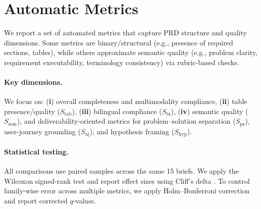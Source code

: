 \section{Automatic Metrics}
\label{sec:metrics}

We report a set of automated metrics that capture PRD structure and quality dimensions.
Some metrics are binary/structural (e.g., presence of required sections, tables), while others approximate semantic quality (e.g., problem clarity, requirement executability, terminology consistency) via rubric-based checks.

\paragraph{Key dimensions.}
We focus on:
(\textbf{i}) overall completeness and multimodality compliance,
(\textbf{ii}) table presence/quality (\(S_{\mathrm{tab}}\)),
(\textbf{iii}) bilingual compliance (\(S_{\mathrm{bi}}\)),
(\textbf{iv}) semantic quality (\(S_{\mathrm{sem}}\)),
and deliverability-oriented metrics for problem--solution separation (\(S_{\mathrm{ps}}\)), user-journey grounding (\(S_{\mathrm{uj}}\)), and hypothesis framing (\(S_{\mathrm{hyp}}\)).

\paragraph{Statistical testing.}
All comparisons use paired samples across the same 15 briefs.
We apply the Wilcoxon signed-rank test \citep{wilcoxon1945} and report effect sizes using Cliff's delta \citep{cliff1993dominance}.
To control family-wise error across multiple metrics, we apply Holm--Bonferroni correction \citep{holm1979} and report corrected \(q\)-values.


